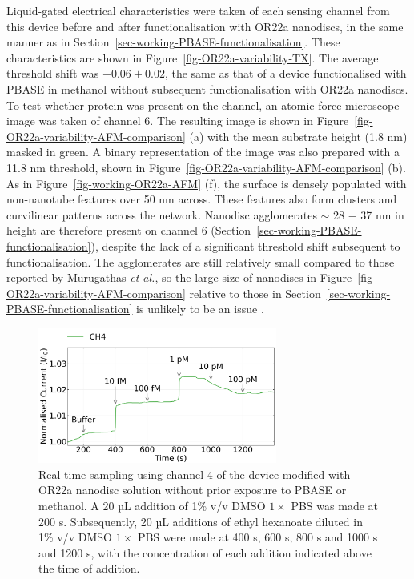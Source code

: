 \documentclass[
  a4paper,
]{scrbook}
\begin{document}
Liquid-gated electrical characteristics were taken of each sensing
channel from this device before and after functionalisation with OR22a
nanodiscs, in the same manner as in
Section~\ref{sec-working-PBASE-functionalisation}. These characteristics
are shown in Figure~\ref{fig-OR22a-variability-TX}. The average
threshold shift was \(-0.06\pm0.02\), the same as that of a device
functionalised with PBASE in methanol without subsequent
functionalisation with OR22a nanodiscs. To test whether protein was
present on the channel, an atomic force microscope image was taken of
channel 6. The resulting image is shown in
Figure~\ref{fig-OR22a-variability-AFM-comparison} (a) with the mean
substrate height (1.8 nm) masked in green. A binary representation of
the image was also prepared with a 11.8 nm threshold, shown in
Figure~\ref{fig-OR22a-variability-AFM-comparison} (b). As in
Figure~\ref{fig-working-OR22a-AFM} (f), the surface is densely populated
with non-nanotube features over 50 nm across. These features also form
clusters and curvilinear patterns across the network. Nanodisc
agglomerates \(\sim\) 28 \(-\) 37 nm in height are therefore present on
channel 6 (Section~\ref{sec-working-PBASE-functionalisation}), despite
the lack of a significant threshold shift subsequent to
functionalisation. The agglomerates are still relatively small compared
to those reported by Murugathas \emph{et al.}, so the large size of
nanodiscs in Figure~\ref{fig-OR22a-variability-AFM-comparison} relative
to those in Section~\ref{sec-working-PBASE-functionalisation} is
unlikely to be an issue \autocite{Murugathas2019a}.

\begin{figure}

{\centering \includegraphics[width=0.7\textwidth,height=\textheight]{figures/ch8/Q4C8_filtered_trunc_arrows_normalised.png}

}

\caption{\label{fig-OR22a-variability-noPBASE-sensing}Real-time sampling
using channel 4 of the device modified with OR22a nanodisc solution
without prior exposure to PBASE or methanol. A 20 µL addition of 1\% v/v
DMSO \(1 \times\) PBS was made at 200 s. Subsequently, 20 µL additions
of ethyl hexanoate diluted in 1\% v/v DMSO \(1 \times\) PBS were made at
400 s, 600 s, 800 s and 1000 s and 1200 s, with the concentration of
each addition indicated above the time of addition.}

\end{figure}
\end{document}

